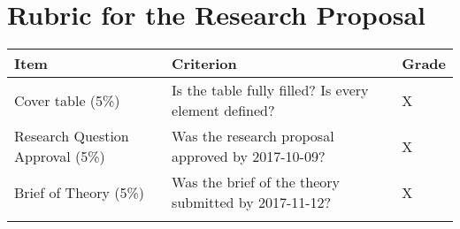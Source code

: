 \documentclass[11pt,]{article}
\theoremstyle{definition}
\theoremstyle{definition}
\theoremstyle{remark}
\begin{document}
\section{Rubric for the Research
Proposal}\label{rubric-for-the-research-proposal}

\begin{longtable}[]{@{}lll@{}}
\toprule
\begin{minipage}[b]{0.12\columnwidth}\raggedright\strut
Item\strut
\end{minipage} & \begin{minipage}[b]{0.76\columnwidth}\raggedright\strut
Criterion\strut
\end{minipage} & \begin{minipage}[b]{0.03\columnwidth}\raggedright\strut
Grade\strut
\end{minipage}\tabularnewline
\midrule
\endhead
\begin{minipage}[t]{0.12\columnwidth}\raggedright\strut
Cover table (5\%)\strut
\end{minipage} & \begin{minipage}[t]{0.76\columnwidth}\raggedright\strut
Is the table fully filled? Is every element defined?\strut
\end{minipage} & \begin{minipage}[t]{0.03\columnwidth}\raggedright\strut
X\strut
\end{minipage}\tabularnewline
\begin{minipage}[t]{0.12\columnwidth}\raggedright\strut
Research Question Approval (5\%)\strut
\end{minipage} & \begin{minipage}[t]{0.76\columnwidth}\raggedright\strut
Was the research proposal approved by 2017-10-09?\strut
\end{minipage} & \begin{minipage}[t]{0.03\columnwidth}\raggedright\strut
X\strut
\end{minipage}\tabularnewline
\begin{minipage}[t]{0.12\columnwidth}\raggedright\strut
Brief of Theory (5\%)\strut
\end{minipage} & \begin{minipage}[t]{0.76\columnwidth}\raggedright\strut
Was the brief of the theory submitted by 2017-11-12?\strut
\end{minipage} & \begin{minipage}[t]{0.03\columnwidth}\raggedright\strut
X\strut
\end{minipage}\tabularnewline
\begin{minipage}[t]{0.12\columnwidth}\raggedright\strut

\end{minipage}
\end{longtable}
\end{document}
